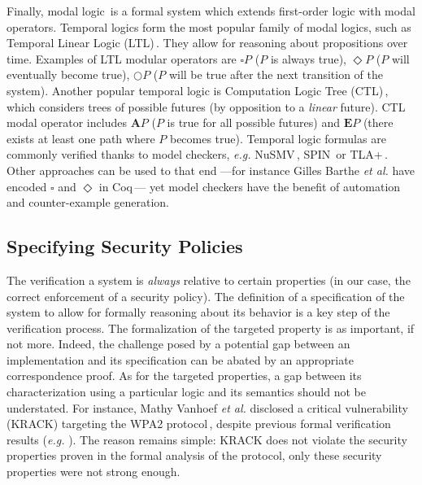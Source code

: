 Finally, modal logic\,\cite{chagrov1997modal} is a formal system which extends
first-order logic with modal operators.
%
Temporal logics form the most popular family of modal logics, such as Temporal
Linear Logic (LTL)\,\cite{sistla1985ltl}.
%
They allow for reasoning about propositions over time.
%
Examples of LTL modular operators are \( \square P \) (\( P \) is always true),
\( \Diamond P \) (\( P \) will eventually become true), \( \bigcirc P \)
(\( P \) will be true after the next transition of the system).
%
Another popular temporal logic is Computation Logic Tree
(CTL)\,\cite{clarke1981ctl}, which considers trees of possible futures (by
opposition to a \emph{linear} future).
%
CTL modal operator includes \( \mathbf{A} P \) (\( P \) is true for all possible
futures) and \( \mathbf{E} P \) (there exists at least one path where \( P \)
becomes true).
%
Temporal logic formulas are commonly verified thanks to model checkers,
\emph{e.g.}  NuSMV\,\cite{cimatti2002nusmv}, SPIN\,\cite{holzmann1997spin} or
TLA+\,\cite{lamport2002tla}.
%
Other approaches can be used to that end ---for instance Gilles Barthe \emph{et
  al.} have encoded \( \square \) and \( \Diamond \) in
Coq\,\cite{barthe2011virtcert1}--- yet model checkers have the benefit of
automation and counter-example generation.

\subsection{Specifying Security Policies}
\label{sec:sota:security}

The verification a system is \emph{always} relative to certain properties (in
our case, the correct enforcement of a security policy).
%
The definition of a specification of the system to allow for formally reasoning
about its behavior is a key step of the verification process.
%
The formalization of the targeted property is as important, if not more.
%
Indeed, the challenge posed by a potential gap between an implementation and its
specification can be abated by an appropriate correspondence proof.
%
As for the targeted properties, a gap between its characterization using a
particular logic and its semantics should not be understated.
%
For instance, Mathy Vanhoef \emph{et al.} disclosed a critical vulnerability
(KRACK) targeting the WPA2 protocol\,\cite{vanhoef2017key}, despite previous
formal verification results (\emph{e.g.} \cite{he2004analysis}).
%
The reason remains simple: KRACK does not violate the security properties proven
in the formal analysis of the protocol, only these security properties were not
strong enough.


